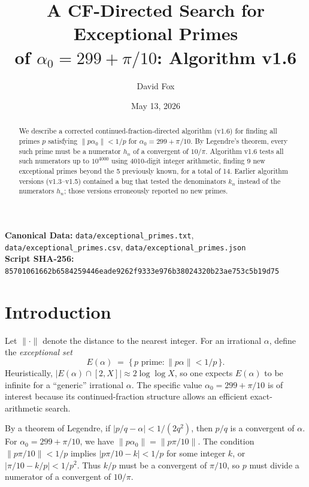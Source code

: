 \documentclass{amsart}
\title{A CF-Directed Search for Exceptional Primes\\
of $\alpha_0 = 299 + \pi/10$: Algorithm v1.6}
\author{David Fox}
\date{May 13, 2026}
\theoremstyle{definition}
\begin{document}
\maketitle

\begin{abstract}
We describe a corrected continued-fraction-directed algorithm (v1.6) for
finding all primes $p$ satisfying $\|p\alpha_0\| < 1/p$ for
$\alpha_0 = 299 + \pi/10$. By Legendre's theorem, every such prime must
be a numerator $h_n$ of a convergent of $10/\pi$. Algorithm v1.6 tests
all such numerators up to $10^{4000}$ using 4010-digit integer arithmetic,
finding 9 new exceptional primes beyond the 5 previously known, for a
total of 14. Earlier algorithm versions (v1.3--v1.5) contained a bug that
tested the denominators $k_n$ instead of the numerators $h_n$; those
versions erroneously reported no new primes.
\end{abstract}

\noindent\textbf{Canonical Data:} \texttt{data/exceptional\_primes.txt}, \texttt{data/exceptional\_primes.csv}, \texttt{data/exceptional\_primes.json}\\
\noindent\textbf{Script SHA-256:} \texttt{85701061662b6584259446eade9262f9333e976b38024320b23ae753c5b19d75}

\section{Introduction}

Let $\|\cdot\|$ denote the distance to the nearest integer. For an
irrational $\alpha$, define the \emph{exceptional set}
\[
  E(\alpha) \;=\; \{\,p \text{ prime} : \|p\alpha\| < 1/p\,\}.
\]
Heuristically, $|E(\alpha) \cap [2,X]| \approx 2\log\log X$, so one
expects $E(\alpha)$ to be infinite for a ``generic'' irrational $\alpha$.
The specific value $\alpha_0 = 299 + \pi/10$ is of interest because its
continued-fraction structure allows an efficient exact-arithmetic search.

By a theorem of Legendre, if $|p/q - \alpha| < 1/(2q^2)$, then $p/q$ is a
convergent of $\alpha$. For $\alpha_0 = 299 + \pi/10$, we have
$\|p\alpha_0\| = \|p\pi/10\|$. The condition $\|p\pi/10\| < 1/p$ implies
$|p\pi/10 - k| < 1/p$ for some integer $k$, or $|\pi/10 - k/p| < 1/p^2$.
Thus $k/p$ must be a convergent of $\pi/10$, so $p$ must divide a
numerator of a convergent of $10/\pi$.

\end{document}
